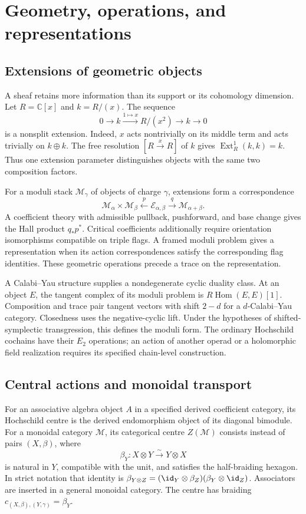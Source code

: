 \part{Geometry, operations, and representations}
\chapter{Extensions of geometric objects}
A sheaf retains more information than its support or its cohomology dimension.
Let $R=\mathbb C[x]$ and $k=R/(x)$.
The sequence
\[
 0\longrightarrow k\xrightarrow{1\mapsto x}R/(x^2)
 \longrightarrow k\longrightarrow0
\]
is a nonsplit extension.
Indeed, $x$ acts nontrivially on its middle term and acts trivially on
$k\oplus k$.
The free resolution $[R\xrightarrow{x}R]$ of $k$ gives
$\operatorname{Ext}^1_R(k,k)=k$.
Thus one extension parameter distinguishes objects with the same two
composition factors.

For a moduli stack $\mathcal M_\gamma$ of objects of charge $\gamma$,
extensions form a correspondence
\[
 \mathcal M_\alpha\times\mathcal M_\beta
 \xleftarrow{p}\mathcal E_{\alpha,\beta}
 \xrightarrow{q}\mathcal M_{\alpha+\beta}.
\]
A coefficient theory with admissible pullback, pushforward, and base
change gives the Hall product $q_*p^*$.
Critical coefficients additionally require orientation isomorphisms
compatible on triple flags.
A framed moduli problem gives a representation when its action
correspondences satisfy the corresponding flag identities.
These geometric operations precede a trace on the representation.

A Calabi--Yau structure supplies a nondegenerate cyclic duality class.
At an object $E$, the tangent complex of its moduli problem is
$R\operatorname{Hom}(E,E)[1]$.
Composition and trace pair tangent vectors with shift $2-d$ for a
$d$-Calabi--Yau category.
Closedness uses the negative-cyclic lift.
Under the hypotheses of shifted-symplectic transgression, this defines
the moduli form.
The ordinary Hochschild cochains have their $E_2$ operations;
an action of another operad or a holomorphic field realization
requires its specified chain-level construction.

\chapter{Central actions and monoidal transport}
For an associative algebra object $A$ in a specified derived coefficient
category, its Hochschild centre is the derived endomorphism object of
its diagonal bimodule.
For a monoidal category $\mathcal M$, its categorical centre
$Z(\mathcal M)$ consists instead of pairs $(X,\beta)$, where
\[
 \beta_Y:X\otimes Y\xrightarrow{\sim}Y\otimes X
\]
is natural in $Y$, compatible with the unit, and satisfies the
half-braiding hexagon.
In strict notation that identity is
$\beta_{Y\otimes Z}=(\id_Y\otimes\beta_Z)(\beta_Y\otimes\id_Z)$.
Associators are inserted in a general monoidal category.
The centre has braiding $c_{(X,\beta),(Y,\gamma)}=\beta_Y$.

